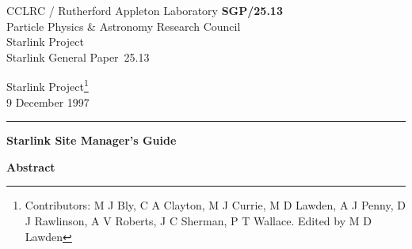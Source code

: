 \documentclass[twoside,11pt]{article}
\newcommand{\stardoccategory}  {Starlink General Paper}
\newcommand{\stardocinitials}  {SGP}
\newcommand{\stardocnumber}    {25.13}
\newcommand{\stardocauthors}   {Starlink Project\footnote[1]{Contributors: 
 M J Bly, C A Clayton, M J Currie, M D Lawden, A J Penny, D J Rawlinson,
 A V Roberts, J C Sherman, P T Wallace.
 Edited by M D Lawden}}
\newcommand{\stardocdate}      {9 December 1997}
\newcommand{\stardoctitle}     {Starlink Site Manager's Guide}
\newcommand{\stardocname}{\stardocinitials /\stardocnumber}
\newenvironment{latexonly}{}{}
\begin{document}
\thispagestyle{empty}

\begin{latexonly}
   CCLRC / {\sc Rutherford Appleton Laboratory} \hfill {\bf \stardocname}\\
   {\large Particle Physics \& Astronomy Research Council}\\
   {\large Starlink Project\\}
   {\large \stardoccategory\ \stardocnumber}
   \begin{flushright}
   \stardocauthors\\
   \stardocdate
   \end{flushright}
   \vspace{-4mm}
   \rule{\textwidth}{0.5mm}
   \vspace{5mm}
   \begin{center}
   {\Huge\bf \stardoctitle}
   \end{center}
   \vspace{5mm}

   \vspace{10mm}
   \begin{center}
      {\Large\bf Abstract}
   \end{center}
\end{latexonly}
\end{document}
